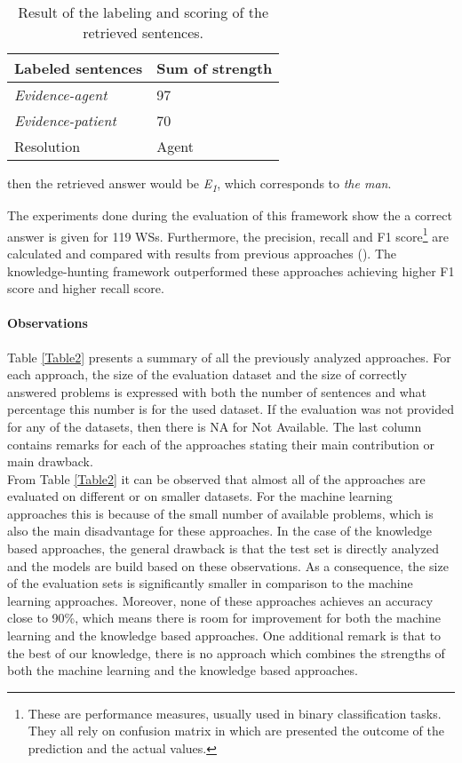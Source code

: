 \begin{enumerate}
\begin{table}[h!]
\begin{center}
		\begin{tabular}{l | l}
			Labeled sentences & Sum of strength \\\hline
			\textit{Evidence-agent} & 97 \\\hline
			\textit{Evidence-patient} & 70 \\\hline
			Resolution & Agent
		\end{tabular}
			\caption{{\label{TableEmami4}}Result of the labeling and scoring of the retrieved sentences.}
	\end{center}
	\end{table}
	then the retrieved answer would be \textit{E\textsubscript{1}}, which corresponds to \textit{the man}.

	
\end{enumerate}

 The experiments done during the evaluation of this framework show the a correct answer is given for 119 WSs. Furthermore, the precision, recall and F1 score\footnote{These are performance measures, usually used in binary classification tasks. They all rely on confusion matrix in which are presented the outcome of the prediction and the actual values.} are calculated and compared with results from previous approaches (\cite{DBLP:conf/aaai/SharmaB16, DBLP:conf/aaaiss/LiuJLZWH17}). The knowledge-hunting framework outperformed these approaches achieving higher F1 score and higher recall score.

\paragraph{Observations} 
Table \ref{Table2} presents a summary of all the previously analyzed approaches. For each approach, the size of the evaluation dataset and the size of correctly answered problems is expressed with both the number of sentences and what percentage this number is for the used dataset. If the evaluation was not provided for any of the datasets, then there is NA for Not Available. The last column contains remarks for each of the approaches stating their main contribution or main drawback. \\ 
From Table \ref{Table2} it can be observed that almost all of the approaches are evaluated on different or on smaller datasets. 
For the machine learning approaches this is because of the small number of available problems, which is also the main disadvantage for these approaches. 
In the case of the knowledge based approaches, the general drawback is that the test set is directly analyzed and the models are build based on these observations. As a consequence, the size of the evaluation sets is significantly smaller in comparison to the machine learning approaches. Moreover, none of these approaches achieves an accuracy close to 90\%, which means there is room for improvement for both the machine learning and the knowledge based approaches. One additional remark is that to the best of our knowledge, there is no approach which combines the strengths of both the machine learning and the knowledge based approaches. \\


